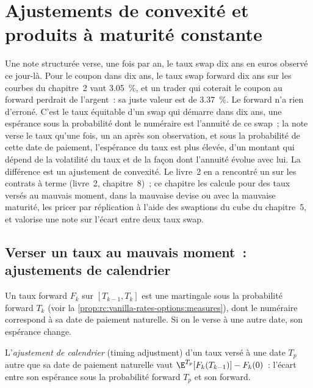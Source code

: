 \chapter{Ajustements de convexité et produits à maturité constante}\label{ch:rc:convexity-adjustments-and-constant-maturity-products}

Une note structurée verse, une fois par an, le taux swap dix ans en euros observé
ce jour-là. Pour le coupon dans dix ans, le taux swap forward dix ans sur les
courbes du chapitre~2 vaut 3.05~\%, et un trader qui coterait le coupon au
forward perdrait de l'argent~: sa juste valeur est de 3.37~\%. Le forward n'a
rien d'erroné. C'est le taux équitable d'un swap qui démarre dans dix ans, une espérance
sous la probabilité dont le numéraire est l'annuité de ce swap~; la note verse le
taux qu'une fois, un an après son observation, et sous la probabilité de cette
date de paiement, l'espérance du taux est plus élevée, d'un montant qui dépend de
la volatilité du taux et de la façon dont l'annuité évolue avec lui. La
différence est un ajustement de convexité. Le livre~2 en a rencontré un sur les
contrats à terme (livre~2, chapitre~8)~; ce chapitre les calcule pour des taux versés
au mauvais moment, dans la mauvaise devise ou avec la mauvaise maturité, les pricer
par réplication à l'aide des swaptions du cube du chapitre~5, et valorise une note sur
l'écart entre deux taux swap.

\section{Verser un taux au mauvais moment~: ajustements de calendrier}

Un taux forward $F_k$ sur $[T_{k-1},T_k]$ est une martingale sous la
probabilité forward $T_k$ (voir la \cref{prop:rc:vanilla-rates-options:measures}), dont
le numéraire correspond à sa date de paiement naturelle. Si on le verse à une
autre date, son espérance change.

\begin{definition}\label{def:rc:convexity-adjustments-and-constant-maturity-products:timing}
L'\emph{ajustement de calendrier} (timing adjustment) d'un taux versé à une date
$T_p$ autre que sa date de paiement naturelle vaut
$\E^{T_p}[F_k(T_{k-1})]-F_k(0)$~: l'écart entre son espérance sous la
probabilité forward $T_p$ et son forward.
\end{definition}

